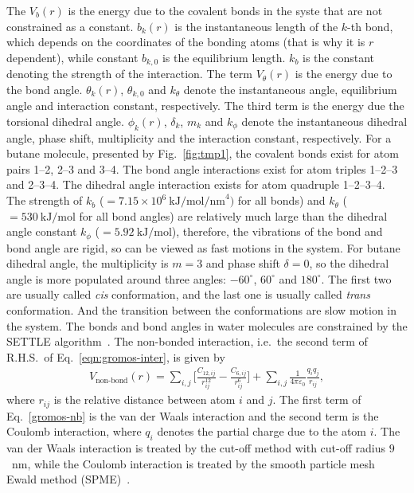 \documentclass[final]{siamltex}
\begin{document}
The $V_b(r)$ is the energy due to the covalent bonds in the syste that
are not constrained as a constant. $b_k(r)$ is the instantaneous
length of the $k$-th bond, which depends on the coordinates of the
bonding atoms (that is why it is $r$ dependent), while constant
$b_{k,0}$ is the equilibrium length. $k_b$ is the constant denoting
the strength of the interaction. The term $V_\theta(r)$ is the energy
due to the bond angle. $\theta_k(r)$, $\theta_{k,0}$ and $k_\theta$
denote the instantaneous angle, equilibrium angle and interaction
constant, respectively. The third term is the energy due the torsional
dihedral angle.  $\phi_k(r)$, $\delta_k$, $m_k$ and $k_\phi$ denote
the instantaneous dihedral angle, phase shift, multiplicity and the
interaction constant, respectively. For a butane molecule, presented
by Fig.~\ref{fig:tmp1}, the covalent bonds exist for atom pairs 1--2,
2--3 and 3--4. The bond angle interactions exist for atom triples
1--2--3 and 2--3--4. The dihedral angle interaction exists for atom
quadruple 1--2--3--4. The strength of $k_b$ ($=7.15\times
10^6~\textrm{kJ/mol/nm}^4)$ for all bonds) and $k_\theta$
($=530~\textrm{kJ/mol}$ for all bond angles) are relatively much large
than the dihedral angle constant $k_\phi$ ($=5.92~\textrm{kJ/mol}$),
therefore, the vibrations of the bond and bond angle are rigid, so can
be viewed as fast motions in the system. For butane dihedral angle,
the multiplicity is $m=3$ and phase shift $\delta = 0$, so the
dihedral angle is more populated around three angles: $-60^\circ$,
$60^\circ$ and $180^\circ$. The first two are usually called
\emph{cis} conformation, and the last one is usually called
\emph{trans} conformation. And the transition between the
conformations are slow motion in the system. The bonds and bond angles
in water molecules are constrained by the SETTLE
algorithm~\cite{miyamoto2004settle}.  The non-bonded interaction,
i.e.~the second term of R.H.S.~of Eq.~\eqref{eqn:gromos-inter}, is
given by
\begin{align}\label{gromos-nb}
  V_{\textrm{non-bond}}(r) =
  \sum_{i,j} \bigg[\frac{C_{12,ij}}{r_{ij}^{12}} - \frac{C_{6,ij}}{r_{ij}^{6}}\bigg]
  +
  \sum_{i,j}\frac{1}{4\pi\varepsilon_0} \frac{q_i q_j}{ r_{ij}},
\end{align}
where $r_{ij}$ is the relative distance between atom $i$ and $j$. The
first term of Eq.~\eqref{gromos-nb} is the van der Waals interaction
and the second term is the Coulomb interaction, where $q_i$ denotes the
partial charge due to the atom $i$. The van der Waals interaction is
treated by the cut-off method with cut-off radius $9$~nm, while the Coulomb
interaction is treated by the smooth particle mesh Ewald
method (SPME)~\cite{essmann1995spm}.
\end{document}
